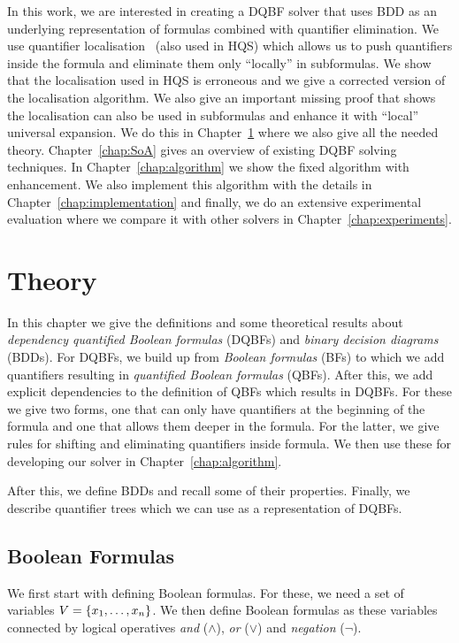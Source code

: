 \documentclass[
  digital, %
  color,
  twoside, %
  table,   %
  nolof,     %
  nolot,     %
]{fithesis3}
\let\setbuilder\set
\newcommand{\simpleset}[1]{\{{#1}\}}
\renewcommand{\set}[1]{\normalexpandarg\IfSubStr{#1}{|}{\setbuilder{#1}}{\simpleset{#1}}}
\theoremstyle{definition}
\theoremstyle{remark}
\begin{document}
In this work, we are interested in creating a DQBF solver that uses BDD as an underlying representation of formulas combined with quantifier elimination. We use quantifier localisation~\cite{HQSquantifierLocalisation} (also used in HQS) which allows us to push quantifiers inside the formula and eliminate them only ``locally'' in subformulas. We show that the localisation used in HQS is erroneous and we give a corrected version of the localisation algorithm. We also give an important missing proof that shows the localisation can also be used in subformulas and enhance it with ``local'' universal expansion. We do this in Chapter~\ref{chap:theory} where we also give all the needed theory. Chapter~\ref{chap:SoA} gives an overview of existing DQBF solving techniques. In Chapter~\ref{chap:algorithm} we show the fixed algorithm with enhancement. We also implement this algorithm with the details in Chapter~\ref{chap:implementation} and finally, we do an extensive experimental evaluation where we compare it with other solvers in Chapter~\ref{chap:experiments}.

\chapter{Theory}
\label{chap:theory}
In this chapter we give the definitions and some theoretical results about \emph{dependency quantified Boolean formulas} (DQBFs) and \emph{binary decision diagrams} (BDDs). For DQBFs, we build up from \emph{Boolean formulas} (BFs) to which we add quantifiers resulting in \emph{quantified Boolean formulas} (QBFs). After this, we add explicit dependencies to the definition of QBFs which results in DQBFs. For these we give two forms, one that can only have quantifiers at the beginning of the formula and one that allows them deeper in the formula. For the latter, we give rules for shifting and eliminating quantifiers inside formula. We then use these for developing our solver in Chapter~\ref{chap:algorithm}. 

After this, we define BDDs and recall some of their properties. Finally, we describe quantifier trees which we can use as a representation of DQBFs.

\section{Boolean Formulas}
We first start with defining Boolean formulas. For these, we need a set of variables $V = \set{x_1, \dots, x_n}$. We then define Boolean formulas as these variables connected by logical operatives \emph{and} (${\land}$), \emph{or} (${\lor}$) and \emph{negation} (${\neg}$).
\end{document}
